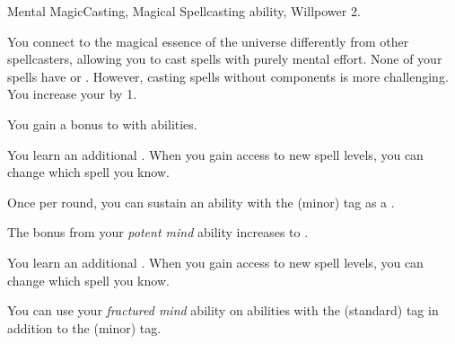     \begin{feat}{Mental Magic}{Casting, Magical}
        \featpre Spellcasting ability, Willpower 2.

         You connect to the magical essence of the universe differently from other spellcasters, allowing you to cast spells with purely mental effort.
        None of your spells have  or .
        However, casting spells without components is more challenging.
        You increase your  by 1.

         You gain a  bonus to  with  abilities.

         You learn an additional .
        When you gain access to new spell levels, you can change which spell you know.

         Once per round, you can sustain an ability with the  (minor) tag as a .

         The bonus from your \textit{potent mind} ability increases to .

         You learn an additional .
        When you gain access to new spell levels, you can change which spell you know.

         You can use your \textit{fractured mind} ability on abilities with the  (standard) tag in addition to the  (minor) tag.
    \end{feat}

